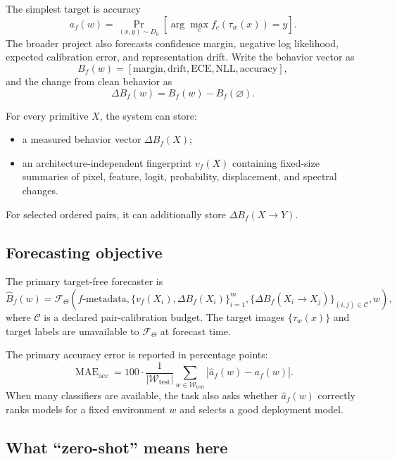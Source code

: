 \documentclass[11pt,a4paper]{article}
\newcommand{\MAE}{\operatorname{MAE}}
\begin{document}
The simplest target is accuracy
\[
a_f(w)=\Pr_{(x,y)\sim D_0}
\left[\arg\max_c f_c(\tau_w(x))=y\right].
\]
The broader project also forecasts confidence margin, negative log likelihood,
expected calibration error, and representation drift.  Write the behavior
vector as
\[
B_f(w)=[\text{margin},\text{drift},\text{ECE},\text{NLL},\text{accuracy}],
\]
and the change from clean behavior as
\[
\Delta B_f(w)=B_f(w)-B_f(\varnothing).
\]

For every primitive $X$, the system can store:
\begin{itemize}
  \item a measured behavior vector $\Delta B_f(X)$;
  \item an architecture-independent fingerprint $v_f(X)$ containing fixed-size
  summaries of pixel, feature, logit, probability, displacement, and spectral
  changes.
\end{itemize}
For selected ordered pairs, it can additionally store
$\Delta B_f(X\to Y)$.

\subsection{Forecasting objective}

The primary target-free forecaster is
\begin{equation}
\widehat B_f(w)=
\mathcal{F}_{\Theta}\!\left(
  f\text{-metadata},
  \{v_f(X_i),\Delta B_f(X_i)\}_{i=1}^{m},
  \{\Delta B_f(X_i\to X_j)\}_{(i,j)\in\mathcal{C}},
  w
\right),
\label{eq:forecast}
\end{equation}
where $\mathcal{C}$ is a declared pair-calibration budget.  The target images
$\{\tau_w(x)\}$ and target labels are unavailable to
$\mathcal{F}_{\Theta}$ at forecast time.

The primary accuracy error is reported in percentage points:
\begin{equation}
\MAE_{\mathrm{acc}}=100\cdot
\frac{1}{|\mathcal{W}_{\mathrm{test}}|}
\sum_{w\in\mathcal{W}_{\mathrm{test}}}
\left|\widehat a_f(w)-a_f(w)\right|.
\end{equation}
When many classifiers are available, the task also asks whether
$\widehat a_f(w)$ correctly ranks models for a fixed environment $w$ and
selects a good deployment model.

\subsection{What ``zero-shot'' means here}
\end{document}
